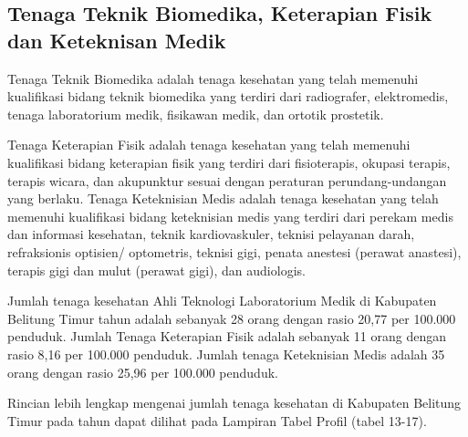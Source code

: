 \subsection{Tenaga Teknik Biomedika, Keterapian Fisik dan Keteknisan Medik}
Tenaga Teknik Biomedika adalah tenaga kesehatan yang telah memenuhi kualifikasi bidang teknik biomedika yang terdiri dari radiografer, elektromedis, tenaga laboratorium medik, fisikawan medik, dan ortotik prostetik.

Tenaga Keterapian Fisik adalah tenaga kesehatan yang telah memenuhi kualifikasi bidang keterapian fisik yang terdiri
dari fisioterapis, okupasi terapis, terapis wicara, dan akupunktur sesuai dengan peraturan perundang-undangan yang
berlaku.
Tenaga Keteknisian Medis adalah tenaga kesehatan yang telah memenuhi kualifikasi bidang keteknisian medis yang
terdiri dari perekam medis dan informasi kesehatan, teknik kardiovaskuler, teknisi pelayanan darah, refraksionis
optisien/ optometris, teknisi gigi, penata anestesi (perawat anastesi), terapis gigi dan mulut (perawat gigi), dan audiologis.

Jumlah tenaga kesehatan Ahli Teknologi Laboratorium Medik di Kabupaten Belitung Timur tahun
\tP adalah sebanyak 28 orang dengan rasio 20,77 per 100.000 penduduk.
Jumlah Tenaga Keterapian Fisik adalah sebanyak 11 orang dengan rasio 8,16 per 100.000 penduduk.
Jumlah tenaga Keteknisian Medis adalah 35 orang dengan rasio 25,96 per 100.000 penduduk.

\vspace{2ex}

Rincian lebih lengkap mengenai jumlah tenaga kesehatan di Kabupaten Belitung Timur pada tahun \tP dapat dilihat pada Lampiran Tabel Profil (tabel 13-17).
